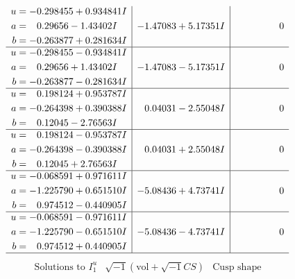 \documentclass[1p]{elsarticle_modified}
\theoremstyle{definition}
\newcommand{\I}{\sqrt{-1}}
\begin{document}
$$\begin{array}{c|c|c}
\begin{aligned}
u &= -0.298455 + 0.934841 I \\
a &= \phantom{-}0.29656 - 1.43402 I \\
b &= -0.263877 + 0.281634 I\end{aligned}
 & -1.47083 + 5.17351 I & \phantom{-0.000000 } 0 \\ \hline\begin{aligned}
u &= -0.298455 - 0.934841 I \\
a &= \phantom{-}0.29656 + 1.43402 I \\
b &= -0.263877 - 0.281634 I\end{aligned}
 & -1.47083 - 5.17351 I & \phantom{-0.000000 } 0 \\ \hline\begin{aligned}
u &= \phantom{-}0.198124 + 0.953787 I \\
a &= -0.264398 + 0.390388 I \\
b &= \phantom{-}0.12045 - 2.76563 I\end{aligned}
 & \phantom{-}0.04031 - 2.55048 I & \phantom{-0.000000 } 0 \\ \hline\begin{aligned}
u &= \phantom{-}0.198124 - 0.953787 I \\
a &= -0.264398 - 0.390388 I \\
b &= \phantom{-}0.12045 + 2.76563 I\end{aligned}
 & \phantom{-}0.04031 + 2.55048 I & \phantom{-0.000000 } 0 \\ \hline\begin{aligned}
u &= -0.068591 + 0.971611 I \\
a &= -1.225790 + 0.651510 I \\
b &= \phantom{-}0.974512 - 0.440905 I\end{aligned}
 & -5.08436 + 4.73741 I & \phantom{-0.000000 } 0 \\ \hline\begin{aligned}
u &= -0.068591 - 0.971611 I \\
a &= -1.225790 - 0.651510 I \\
b &= \phantom{-}0.974512 + 0.440905 I\end{aligned}
 & -5.08436 - 4.73741 I & \phantom{-0.000000 } 0\\
 \hline 
 \end{array}$$\newpage$$\begin{array}{c|c|c}  
\text{Solutions to }I^u_{1}& \I (\text{vol} + \sqrt{-1}CS) & \text{Cusp shape}\\
 \hline 
\begin{aligned}

\end{aligned}
\end{array}$$
\end{document}
